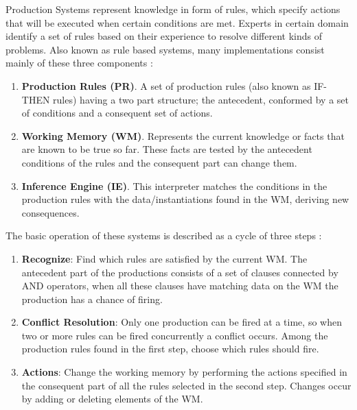 Production Systems represent knowledge in form of rules, which specify
actions that will be executed when certain conditions are met. Experts
in certain domain identify a set of rules based on their experience to
resolve different kinds of problems. Also known as rule based systems,
many implementations consist mainly of these three
components \cite{brachman1992knowledge} \cite{konar2006computational}:
\begin{enumerate}   
\item \textbf{Production Rules (PR)}. A set of
production rules (also known as IF-THEN rules) having a two part
structure; the antecedent, conformed by a set of conditions and a
consequent set of actions. 
\item \textbf{Working Memory (WM)}.
Represents the current knowledge or facts that are known to be true so
far. These facts are tested by the antecedent conditions of the rules
and the consequent part can change them. 
\item \textbf{Inference Engine (IE)}. 
This interpreter matches the conditions in the
production rules with the data/instantiations found in the WM,
deriving new consequences.
\end{enumerate}
The basic operation of these systems is described as a cycle of 
three steps \cite{brachman1992knowledge}:
\begin{enumerate}
\item \textbf{Recognize}: Find which rules are satisfied by 
the current WM. The antecedent part of the productions consists 
of a set of clauses connected by AND operators, when all these 
clauses have matching data on the WM the production has a chance 
of firing.
\item \textbf{Conflict Resolution}: Only one production can be 
fired at a time, so when two or more rules can be fired concurrently 
a conflict occurs. Among the production rules found in the first 
step, choose which rules should fire.
\item \textbf{Actions}: Change the working memory by performing 
the actions specified in the consequent part of all the rules 
selected in the second step. Changes occur by adding or 
deleting elements of the WM.
\end{enumerate}

